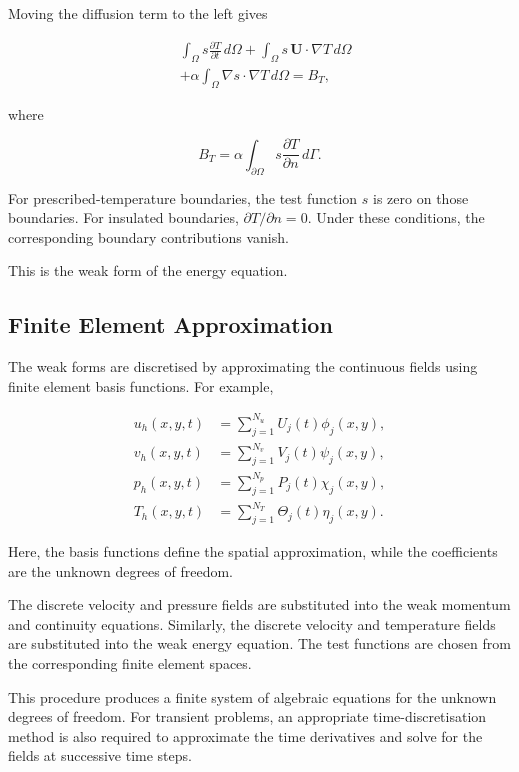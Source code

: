 \documentclass{article}
\begin{document}
Moving the diffusion term to the left gives

\begin{equation}
\boxed{
\begin{aligned}
&\int_\Omega s\frac{\partial T}{\partial t}\,d\Omega
+\int_\Omega s\,\mathbf{U}\cdot\nabla T\,d\Omega\\
&+\alpha\int_\Omega
\nabla s\cdot\nabla T\,d\Omega=B_T,
\end{aligned}
}
\end{equation}

where

\begin{equation}
B_T=\alpha\int_{\partial\Omega}
s\frac{\partial T}{\partial n}\,d\Gamma.
\end{equation}

For prescribed-temperature boundaries, the test function
$s$ is zero on those boundaries. For insulated boundaries,
$\partial T/\partial n=0$. Under these conditions, the
corresponding boundary contributions vanish.

This is the weak form of the energy equation.

\subsection{Finite Element Approximation}

The weak forms are discretised by approximating the
continuous fields using finite element basis functions.
For example,

\begin{align}
u_h(x,y,t)&=\sum_{j=1}^{N_u}U_j(t)\phi_j(x,y),\\
v_h(x,y,t)&=\sum_{j=1}^{N_v}V_j(t)\psi_j(x,y),\\
p_h(x,y,t)&=\sum_{j=1}^{N_p}P_j(t)\chi_j(x,y),\\
T_h(x,y,t)&=\sum_{j=1}^{N_T}\Theta_j(t)\eta_j(x,y).
\end{align}

Here, the basis functions define the spatial approximation,
while the coefficients are the unknown degrees of freedom.

The discrete velocity and pressure fields are substituted
into the weak momentum and continuity equations. Similarly,
the discrete velocity and temperature fields are substituted
into the weak energy equation. The test functions are
chosen from the corresponding finite element spaces.

This procedure produces a finite system of algebraic
equations for the unknown degrees of freedom. For transient
problems, an appropriate time-discretisation method is
also required to approximate the time derivatives and solve
for the fields at successive time steps.
\end{document}
